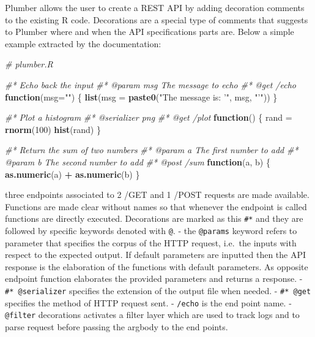 \documentclass[
  12pt,
  a4paper,
  oneside]{book}
\newenvironment{Shaded}{\begin{snugshade}}{\end{snugshade}}
\newcommand{\CommentTok}[1]{\textcolor[rgb]{0.56,0.35,0.01}{\textit{#1}}}
\newcommand{\ControlFlowTok}[1]{\textcolor[rgb]{0.13,0.29,0.53}{\textbf{#1}}}
\newcommand{\DataTypeTok}[1]{\textcolor[rgb]{0.13,0.29,0.53}{#1}}
\newcommand{\DecValTok}[1]{\textcolor[rgb]{0.00,0.00,0.81}{#1}}
\newcommand{\KeywordTok}[1]{\textcolor[rgb]{0.13,0.29,0.53}{\textbf{#1}}}
\newcommand{\NormalTok}[1]{#1}
\newcommand{\OperatorTok}[1]{\textcolor[rgb]{0.81,0.36,0.00}{\textbf{#1}}}
\newcommand{\StringTok}[1]{\textcolor[rgb]{0.31,0.60,0.02}{#1}}
\begin{document}
Plumber allows the user to create a REST API by adding decoration comments to the existing R code. Decorations are a special type of comments that suggests to Plumber where and when the API specifications parts are. Below a simple example extracted by the documentation:

\begin{Shaded}
\begin{Highlighting}[]
\CommentTok{# plumber.R}

\CommentTok{#* Echo back the input}
\CommentTok{#* @param msg The message to echo}
\CommentTok{#* @get /echo}
\ControlFlowTok{function}\NormalTok{(}\DataTypeTok{msg=}\StringTok{""}\NormalTok{) \{}
  \KeywordTok{list}\NormalTok{(}\DataTypeTok{msg =} \KeywordTok{paste0}\NormalTok{(}\StringTok{"The message is: '"}\NormalTok{, msg, }\StringTok{"'"}\NormalTok{))}
\NormalTok{\}}

\CommentTok{#* Plot a histogram}
\CommentTok{#* @serializer png}
\CommentTok{#* @get /plot}
\ControlFlowTok{function}\NormalTok{() \{}
\NormalTok{  rand =}\StringTok{ }\KeywordTok{rnorm}\NormalTok{(}\DecValTok{100}\NormalTok{)}
  \KeywordTok{hist}\NormalTok{(rand)}
\NormalTok{\}}

\CommentTok{#* Return the sum of two numbers}
\CommentTok{#* @param a The first number to add}
\CommentTok{#* @param b The second number to add}
\CommentTok{#* @post /sum}
\ControlFlowTok{function}\NormalTok{(a, b) \{}
  \KeywordTok{as.numeric}\NormalTok{(a) }\OperatorTok{+}\StringTok{ }\KeywordTok{as.numeric}\NormalTok{(b)}
\NormalTok{\}}
\end{Highlighting}
\end{Shaded}

three endpoints associated to 2 /GET and 1 /POST requests are made available. Functions are made clear without names so that whenever the endpoint is called functions are directly executed.
Decorations are marked as this \texttt{\#*} and they are followed by specific keywords denoted with \texttt{@}.
- the \texttt{@params} keyword refers to parameter that specifies the corpus of the HTTP request, i.e.~the inputs with respect to the expected output. If default parameters are inputted then the API response is the elaboration of the functions with default parameters. As opposite endpoint function elaborates the provided parameters and returns a response.
- \texttt{\#*\ @serializer} specifies the extension of the output file when needed.
- \texttt{\#*\ @get} specifies the method of HTTP request sent.
- \texttt{/echo} is the end point name.
- \texttt{@filter} decorations activates a filter layer which are used to track logs and to parse request before passing the argbody to the end points.
\end{document}

